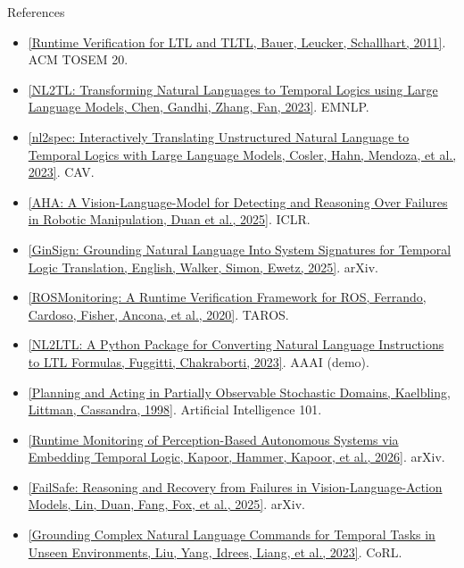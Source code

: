 \documentclass[14pt, aspectratio=169]{beamer}
\newcommand{\paper}[4]{\href{#1}{[#2, #3, #4]}}
\begin{document}
\begin{frame}[allowframebreaks]{References}
    \tiny
    \begin{itemize}
        \item[] \paper{https://doi.org/10.1145/2000799.2000800}{Runtime Verification for LTL and TLTL}{Bauer, Leucker, Schallhart}{2011}. ACM TOSEM 20.
        \item[] \paper{https://arxiv.org/abs/2305.07766}{NL2TL: Transforming Natural Languages to Temporal Logics using Large Language Models}{Chen, Gandhi, Zhang, Fan}{2023}. EMNLP.
        \item[] \paper{https://doi.org/10.1007/978-3-031-37703-7_18}{nl2spec: Interactively Translating Unstructured Natural Language to Temporal Logics with Large Language Models}{Cosler, Hahn, Mendoza, et al.}{2023}. CAV.
        \item[] \paper{https://proceedings.iclr.cc/paper_files/paper/2025/hash/70a06501001e1820fd1eb9ee821302d2-Abstract-Conference.html}{AHA: A Vision-Language-Model for Detecting and Reasoning Over Failures in Robotic Manipulation}{Duan et al.}{2025}. ICLR.
        \item[] \paper{https://arxiv.org/abs/2512.16770}{GinSign: Grounding Natural Language Into System Signatures for Temporal Logic Translation}{English, Walker, Simon, Ewetz}{2025}. arXiv.
        \item[] \paper{https://doi.org/10.1007/978-3-030-63486-5_40}{ROSMonitoring: A Runtime Verification Framework for ROS}{Ferrando, Cardoso, Fisher, Ancona, et al.}{2020}. TAROS.
        \item[] \paper{https://doi.org/10.1609/aaai.v37i13.27068}{NL2LTL: A Python Package for Converting Natural Language Instructions to LTL Formulas}{Fuggitti, Chakraborti}{2023}. AAAI (demo).
        \item[] \paper{https://doi.org/10.1016/S0004-3702(98)00023-X}{Planning and Acting in Partially Observable Stochastic Domains}{Kaelbling, Littman, Cassandra}{1998}. Artificial Intelligence 101.
        \item[] \paper{https://arxiv.org/abs/2605.12651}{Runtime Monitoring of Perception-Based Autonomous Systems via Embedding Temporal Logic}{Kapoor, Hammer, Kapoor, et al.}{2026}. arXiv.
        \item[] \paper{https://arxiv.org/abs/2510.01642}{FailSafe: Reasoning and Recovery from Failures in Vision-Language-Action Models}{Lin, Duan, Fang, Fox, et al.}{2025}. arXiv.
        \item[] \paper{https://proceedings.mlr.press/v229/liu23d.html}{Grounding Complex Natural Language Commands for Temporal Tasks in Unseen Environments}{Liu, Yang, Idrees, Liang, et al.}{2023}. CoRL.

\end{itemize}
\end{frame}
\end{document}
